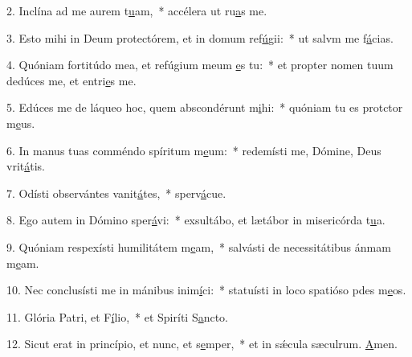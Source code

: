 2. Inclína ad me aurem t\uline{u}am,~* accélera ut ru\uline{a}s me.\par 
3. Esto mihi in Deum protectórem, et in domum ref\uline{ú}gii:~* ut salvm me f\uline{á}cias.\par 
4. Quóniam fortitúdo mea, et refúgium meum \uline{e}s tu:~* et propter nomen tuum dedúces me, et entri\uline{e}s me.\par 
5. Edúces me de láqueo hoc, quem abscondérunt m\uline{i}hi:~* quóniam tu es protctor m\uline{e}us.\par 
6. In manus tuas comméndo spíritum m\uline{e}um:~* redemísti me, Dómine, Deus vrit\uline{á}tis.\par 
7. Odísti observántes vanit\uline{á}tes,~* sperv\uline{á}cue.\par 
8. Ego autem in Dómino sper\uline{á}vi:~* exsultábo, et lætábor in misericórda t\uline{u}a.\par 
9. Quóniam respexísti humilitátem m\uline{e}am,~* salvásti de necessitátibus ánmam m\uline{e}am.\par 
10. Nec conclusísti me in mánibus inim\uline{í}ci:~* statuísti in loco spatióso pdes m\uline{e}os.\par 
11. Glória Patri, et F\uline{í}lio,~* et Spiríti S\uline{a}ncto.\par 
12. Sicut erat in princípio, et nunc, et s\uline{e}mper,~* et in sǽcula sæculrum. \uline{A}men.\par 
